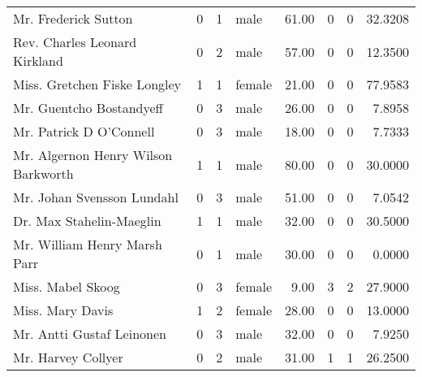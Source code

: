 \begin{tabular}{lrrlrrrr}
Mr. Frederick Sutton                               &         0 &       1 &    male &  61.00 &                        0 &                        0 &   32.3208 \\
Rev. Charles Leonard Kirkland                      &         0 &       2 &    male &  57.00 &                        0 &                        0 &   12.3500 \\
Miss. Gretchen Fiske Longley                       &         1 &       1 &  female &  21.00 &                        0 &                        0 &   77.9583 \\
Mr. Guentcho Bostandyeff                           &         0 &       3 &    male &  26.00 &                        0 &                        0 &    7.8958 \\
Mr. Patrick D O'Connell                            &         0 &       3 &    male &  18.00 &                        0 &                        0 &    7.7333 \\
Mr. Algernon Henry Wilson Barkworth                &         1 &       1 &    male &  80.00 &                        0 &                        0 &   30.0000 \\
Mr. Johan Svensson Lundahl                         &         0 &       3 &    male &  51.00 &                        0 &                        0 &    7.0542 \\
Dr. Max Stahelin-Maeglin                           &         1 &       1 &    male &  32.00 &                        0 &                        0 &   30.5000 \\
Mr. William Henry Marsh Parr                       &         0 &       1 &    male &  30.00 &                        0 &                        0 &    0.0000 \\
Miss. Mabel Skoog                                  &         0 &       3 &  female &   9.00 &                        3 &                        2 &   27.9000 \\
Miss. Mary Davis                                   &         1 &       2 &  female &  28.00 &                        0 &                        0 &   13.0000 \\
Mr. Antti Gustaf Leinonen                          &         0 &       3 &    male &  32.00 &                        0 &                        0 &    7.9250 \\
Mr. Harvey Collyer                                 &         0 &       2 &    male &  31.00 &                        1 &                        1 &   26.2500 \\

\end{tabular}

